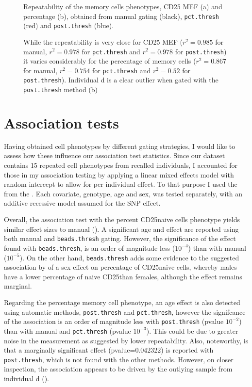 \begin{figure}
\begin{minipage}{.7\textwidth}
\end{minipage}
{Repeatability of the memory cells phenotypes, CD25 MEF (a) and percentage (b), obtained from manual gating (black), \texttt{pct.thresh} (red) and \texttt{post.thresh} (blue).}
{
  While the repeatability is very close for CD25 MEF
  ($r^2=0.985$ for manual, $r^2=0.978$ for \texttt{pct.thresh} and $r^2=0.978$ for \texttt{post.thresh})
  it varies considerably for the percentage of memory cells
  ($r^2=0.867$ for manual, $r^2=0.754$ for \texttt{pct.thresh} and $r^2=0.52$ for \texttt{post.thresh}).
  Individual d is a clear outlier when gated with the \texttt{post.thresh} method (b)

}
\end{figure}




\section{Association tests}

Having obtained cell phenotypes by different gating strategies, 
I would like to assess how these influence our association test statistics.
Since our dataset contains 15 repeated cell phenotypes from recalled individuals,
I accounted for those in my association testing 
by applying a linear mixed effects model with random intercept to allow for per individual effect.
To that purpose I used the  from the .
Each covariate, genotype, age and sex, was tested separately, with an additive recessive model assumed for the SNP effect.

Overall, the association test with the percent CD25\positive naive cells phenotype yields similar effect sizes to manual ().
A significant age and  effect are reported using both manual and \texttt{beads.thresh} gating.
However, the significance of the  effect found with \texttt{beads.thresh}, is an order of magnitude less ($10^{-4}$) than with manual ($10^{-5}$).
On the other hand, \texttt{beads.thresh} adds some evidence to the suggested association by \citet{Dendrou:2009dv} of a sex effect on percentage of CD25\positive naive cells,
whereby males have a lower percentage of naive CD25\positive than females, although the effect remains marginal.

Regarding the percentage memory cell phenotype,
an age effect is also detected using automatic methods, \texttt{post.thresh} and \texttt{pct.thresh}, however the signifcance of the association 
is an order of magnitude less with \texttt{post.thresh} (pvalue $10^{-2}$) than with manual and \texttt{pct.thresh} (pvalue $10^{-3}$).
This could be due to greater noise in the measurement as suggested by lower repeatability.
Also, noteworthy, is that a marginally significant  effect (pvalue=$0.042322$) is reported with \texttt{post.thresh}, which is not found with the
other methods.  
However, on closer inspection, the association appears to be driven by the outlying sample from individual d ().

